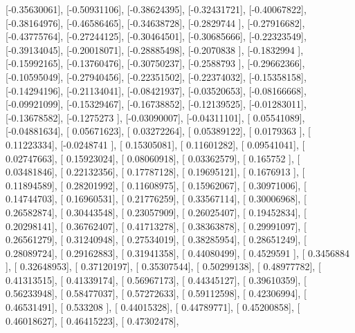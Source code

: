 \documentclass{article}
\begin{document}
       [-0.35630061],
       [-0.50931106],
       [-0.38624395],
       [-0.32431721],
       [-0.40067822],
       [-0.38164976],
       [-0.46586465],
       [-0.34638728],
       [-0.2829744 ],
       [-0.27916682],
       [-0.43775764],
       [-0.27244125],
       [-0.30464501],
       [-0.30685666],
       [-0.22323549],
       [-0.39134045],
       [-0.20018071],
       [-0.28885498],
       [-0.2070838 ],
       [-0.1832994 ],
       [-0.15992165],
       [-0.13760476],
       [-0.30750237],
       [-0.2588793 ],
       [-0.29662366],
       [-0.10595049],
       [-0.27940456],
       [-0.22351502],
       [-0.22374032],
       [-0.15358158],
       [-0.14294196],
       [-0.21134041],
       [-0.08421937],
       [-0.03520653],
       [-0.08166668],
       [-0.09921099],
       [-0.15329467],
       [-0.16738852],
       [-0.12139525],
       [-0.01283011],
       [-0.13678582],
       [-0.1275273 ],
       [-0.03090007],
       [-0.04311101],
       [ 0.05541089],
       [-0.04881634],
       [ 0.05671623],
       [ 0.03272264],
       [ 0.05389122],
       [ 0.0179363 ],
       [ 0.11223334],
       [-0.0248741 ],
       [ 0.15305081],
       [ 0.11601282],
       [ 0.09541041],
       [ 0.02747663],
       [ 0.15923024],
       [ 0.08060918],
       [ 0.03362579],
       [ 0.165752  ],
       [ 0.03481846],
       [ 0.22132356],
       [ 0.17787128],
       [ 0.19695121],
       [ 0.1676913 ],
       [ 0.11894589],
       [ 0.28201992],
       [ 0.11608975],
       [ 0.15962067],
       [ 0.30971006],
       [ 0.14744703],
       [ 0.16960531],
       [ 0.21776259],
       [ 0.33567114],
       [ 0.30006968],
       [ 0.26582874],
       [ 0.30443548],
       [ 0.23057909],
       [ 0.26025407],
       [ 0.19452834],
       [ 0.20298141],
       [ 0.36762407],
       [ 0.41713278],
       [ 0.38363878],
       [ 0.29991097],
       [ 0.26561279],
       [ 0.31240948],
       [ 0.27534019],
       [ 0.38285954],
       [ 0.28651249],
       [ 0.28089724],
       [ 0.29162883],
       [ 0.31941358],
       [ 0.44080499],
       [ 0.4529591 ],
       [ 0.3456884 ],
       [ 0.32648953],
       [ 0.37120197],
       [ 0.35307544],
       [ 0.50299138],
       [ 0.48977782],
       [ 0.41313515],
       [ 0.41339174],
       [ 0.56967173],
       [ 0.44345127],
       [ 0.39610359],
       [ 0.56233948],
       [ 0.58477037],
       [ 0.57272633],
       [ 0.59112598],
       [ 0.42306994],
       [ 0.46531491],
       [ 0.533208  ],
       [ 0.44015328],
       [ 0.44789771],
       [ 0.45200858],
       [ 0.46018627],
       [ 0.46415223],
       [ 0.47302478],
\end{document}

